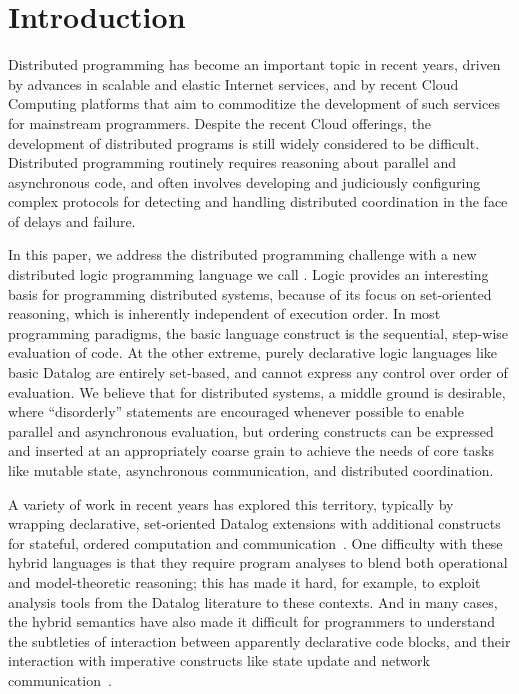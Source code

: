 \section{Introduction}
Distributed programming has become an important topic in recent years, driven by advances in scalable and elastic Internet services, and by recent Cloud Computing platforms that aim to commoditize the development of such services for mainstream programmers.  Despite the recent Cloud offerings, the development of distributed programs is still widely considered to be difficult.  Distributed programming routinely requires reasoning about parallel and asynchronous code, and often involves developing and judiciously configuring complex protocols for detecting and handling distributed coordination in the face of delays and failure.

In this paper, we address the distributed programming challenge with a new distributed logic programming language we call {\em \lang}.
Logic provides an interesting basis for programming distributed systems, because of its focus on set-oriented reasoning, which is inherently independent of execution order.  In most programming paradigms, the basic language construct is the sequential, step-wise evaluation of code. At the other extreme, purely declarative logic languages like basic Datalog are entirely set-based, and cannot express any control over order of evaluation.  We believe that for distributed systems, a middle ground is desirable, where ``disorderly'' statements are encouraged whenever possible to enable parallel and asynchronous evaluation, but ordering constructs can be expressed and inserted at an appropriately coarse grain to achieve the needs of core tasks like mutable state, asynchronous communication, and distributed coordination.

A variety of work in recent years has explored this territory, typically by wrapping declarative, set-oriented Datalog extensions with additional constructs for stateful, ordered computation and communication~\cite{boon,reactors,meld,prologevents}.  One difficulty with these hybrid languages is that they require program analyses to blend both operational and model-theoretic  reasoning; this has made it hard, for example, to exploit analysis tools from the Datalog literature to these contexts.  And in many cases, the hybrid semantics have also made it difficult for programmers to understand the subtleties of interaction between apparently declarative code blocks, and their interaction with imperative constructs like state update and network communication~\cite{Mao2009,navarro}.

